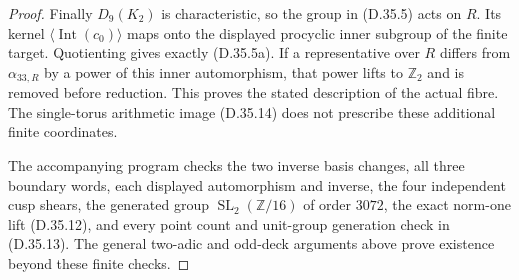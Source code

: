 \begin{proof}
Finally $D_9(K_2)$ is characteristic, so the group in (D.35.5)
acts on $R$. Its kernel $\langle\operatorname{Int}(c_0)\rangle$
maps onto the displayed procyclic inner subgroup of the finite target.
Quotienting gives exactly (D.35.5a). If a representative over $R$
differs from $\alpha_{33,R}$ by a power of this inner automorphism,
that power lifts to $\mathbb Z_2$ and is removed before reduction.
This proves the stated description of the actual fibre. The
single-torus arithmetic image (D.35.14) does not prescribe these
additional finite coordinates.

The accompanying program checks the two inverse basis changes, all
three boundary words, each displayed automorphism and inverse, the
four independent cusp shears, the generated group
$\operatorname{SL}_2(\mathbb Z/16)$ of order $3072$, the exact
norm-one lift (D.35.12), and every point count and unit-group
generation check in (D.35.13). The general two-adic and odd-deck arguments
above prove existence beyond these finite checks.
\end{proof}
